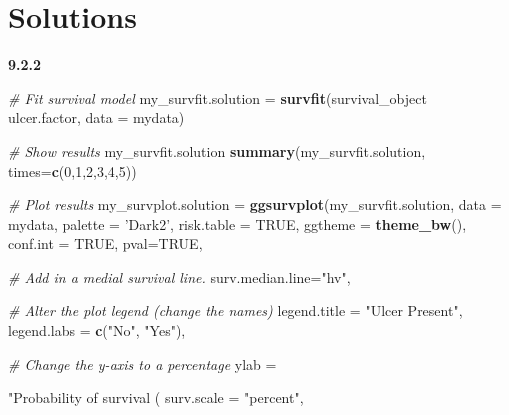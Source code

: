 \documentclass[12pt,]{krantz}
\makeatletter
\newenvironment{Shaded}{\begin{snugshade}}{\end{snugshade}}
\newcommand{\CommentTok}[1]{\textcolor[rgb]{0.56,0.35,0.01}{\textit{#1}}}
\newcommand{\DataTypeTok}[1]{\textcolor[rgb]{0.13,0.29,0.53}{#1}}
\newcommand{\DecValTok}[1]{\textcolor[rgb]{0.00,0.00,0.81}{#1}}
\newcommand{\KeywordTok}[1]{\textcolor[rgb]{0.13,0.29,0.53}{\textbf{#1}}}
\newcommand{\NormalTok}[1]{#1}
\newcommand{\OperatorTok}[1]{\textcolor[rgb]{0.81,0.36,0.00}{\textbf{#1}}}
\newcommand{\OtherTok}[1]{\textcolor[rgb]{0.56,0.35,0.01}{#1}}
\newcommand{\StringTok}[1]{\textcolor[rgb]{0.31,0.60,0.02}{#1}}
\newenvironment{kframe}{%
\medskip{}
\setlength{\fboxsep}{.8em}
 \def\at@end@of@kframe{}%
 \ifinner\ifhmode%
  \def\at@end@of@kframe{\end{minipage}}%
  \begin{minipage}{\columnwidth}%
 \fi\fi%
 \def\FrameCommand##1{\hskip\@totalleftmargin \hskip-\fboxsep
 \colorbox{shadecolor}{##1}\hskip-\fboxsep
     \hskip-\linewidth \hskip-\@totalleftmargin \hskip\columnwidth}%
 \MakeFramed {\advance\hsize-\width
   \@totalleftmargin\z@ \linewidth\hsize
   \@setminipage}}%
 {\par\unskip\endMakeFramed%
 \at@end@of@kframe}
\renewenvironment{Shaded}{\begin{kframe}}{\end{kframe}}
\theoremstyle{definition}
\theoremstyle{definition}
\theoremstyle{definition}
\theoremstyle{remark}
\makeatother
\begin{document}
\hypertarget{solutions-3}{%
\section{Solutions}\label{solutions-3}}

\textbf{9.2.2}

\begin{Shaded}
\begin{Highlighting}[]
\CommentTok{# Fit survival model}
\NormalTok{my_survfit.solution =}\StringTok{ }\KeywordTok{survfit}\NormalTok{(survival_object }\OperatorTok{~}\StringTok{ }\NormalTok{ulcer.factor, }\DataTypeTok{data =}\NormalTok{ mydata)}

\CommentTok{# Show results}
\NormalTok{my_survfit.solution}
\KeywordTok{summary}\NormalTok{(my_survfit.solution, }\DataTypeTok{times=}\KeywordTok{c}\NormalTok{(}\DecValTok{0}\NormalTok{,}\DecValTok{1}\NormalTok{,}\DecValTok{2}\NormalTok{,}\DecValTok{3}\NormalTok{,}\DecValTok{4}\NormalTok{,}\DecValTok{5}\NormalTok{))}

\CommentTok{# Plot results}
\NormalTok{my_survplot.solution =}\StringTok{ }\KeywordTok{ggsurvplot}\NormalTok{(my_survfit.solution,}
                         \DataTypeTok{data =}\NormalTok{ mydata,}
                         \DataTypeTok{palette =} \StringTok{'Dark2'}\NormalTok{,}
                         \DataTypeTok{risk.table =} \OtherTok{TRUE}\NormalTok{,}
                         \DataTypeTok{ggtheme =} \KeywordTok{theme_bw}\NormalTok{(),}
                         \DataTypeTok{conf.int =} \OtherTok{TRUE}\NormalTok{,}
                         \DataTypeTok{pval=}\OtherTok{TRUE}\NormalTok{,}
                         
                         \CommentTok{# Add in a medial survival line.}
                         \DataTypeTok{surv.median.line=}\StringTok{"hv"}\NormalTok{,}

                         \CommentTok{# Alter the plot legend (change the names)}
                         \DataTypeTok{legend.title =} \StringTok{"Ulcer Present"}\NormalTok{, }
                         \DataTypeTok{legend.labs =} \KeywordTok{c}\NormalTok{(}\StringTok{"No"}\NormalTok{, }\StringTok{"Yes"}\NormalTok{),}
                        
                         \CommentTok{# Change the y-axis to a percentage}
                         \DataTypeTok{ylab =} \StringTok{"Probability of survival (%
                         \DataTypeTok{surv.scale =} \StringTok{"percent"}\NormalTok{,}

}
\end{Highlighting}
\end{Shaded}
\end{document}
